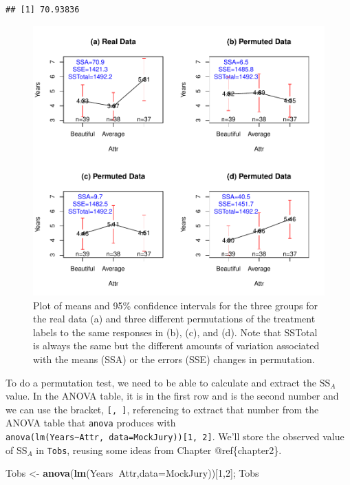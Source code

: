 \documentclass[]{book}
\newenvironment{Shaded}{\begin{snugshade}}{\end{snugshade}}
\newcommand{\KeywordTok}[1]{\textcolor[rgb]{0.13,0.29,0.53}{\textbf{#1}}}
\newcommand{\DataTypeTok}[1]{\textcolor[rgb]{0.13,0.29,0.53}{#1}}
\newcommand{\DecValTok}[1]{\textcolor[rgb]{0.00,0.00,0.81}{#1}}
\newcommand{\StringTok}[1]{\textcolor[rgb]{0.31,0.60,0.02}{#1}}
\newcommand{\OperatorTok}[1]{\textcolor[rgb]{0.81,0.36,0.00}{\textbf{#1}}}
\newcommand{\NormalTok}[1]{#1}
\begin{document}
\begin{verbatim}
## [1] 70.93836
\end{verbatim}

\begin{figure}
\centering
\includegraphics{GreenwoodBanner_files/figure-latex/Figure3-4-1.pdf}
\caption{\label{fig:Figure3-4}Plot of means and 95\% confidence intervals for the three
groups for the real data (a) and three different permutations of the
treatment labels to the same responses in (b), (c), and (d). Note that
SSTotal is always the same but the different amounts of variation
associated with the means (SSA) or the errors (SSE) changes in
permutation.}
\end{figure}

To do a permutation test, we need to be able to calculate and extract
the \(\text{SS}_A\) value. In the ANOVA table, it is in the first row
and is the second number and we can use the bracket, \texttt{{[},\ {]}},
referencing to extract that number from the ANOVA table that
\texttt{anova} produces with
\texttt{anova(lm(Years\textasciitilde{}Attr,\ data=MockJury)){[}1,\ 2{]}}.
We'll store the observed value of \(\text{SS}_A\) in \texttt{Tobs},
reusing some ideas from Chapter @ref\{chapter2\}.

\begin{Shaded}
\begin{Highlighting}[]
\NormalTok{Tobs <-}\StringTok{ }\KeywordTok{anova}\NormalTok{(}\KeywordTok{lm}\NormalTok{(Years}\OperatorTok{~}\NormalTok{Attr,}\DataTypeTok{data=}\NormalTok{MockJury))[}\DecValTok{1}\NormalTok{,}\DecValTok{2}\NormalTok{]; Tobs}
\end{Highlighting}
\end{Shaded}
\end{document}
